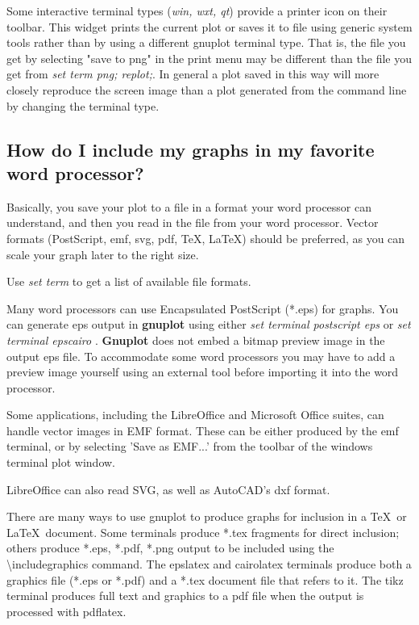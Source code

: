 \documentclass[letter,11pt]{article}
\newcommand{\gnuplot}{\textbf{gnuplot }}
\newcommand{\Gnuplot}{\textbf{Gnuplot }}
\begin{document}
{Some interactive terminal types ({\em win, wxt, qt}) provide a printer icon
on their toolbar. This widget prints the current plot or saves it to file
using generic system tools rather than by using a different gnuplot terminal type.
That is, the file you get by selecting "save to png" in the print menu may be
different than the file you get from {\em set term png; replot;}.
In general a plot saved in this way will more closely reproduce the screen image than
a plot generated from the command line by changing the terminal type.


\subsection{How do I include my graphs in my favorite word processor?}

Basically, you save your plot to a file in a format your word processor
can understand, and then you read in the file from your word processor. Vector
formats (PostScript, emf, svg, pdf, \TeX{}, \LaTeX{}) should be preferred,
as you can scale your graph later to the right size.

Use {\em set term} to get a list of available file formats.

Many word processors can use Encapsulated PostScript (*.eps) for graphs.
You can generate eps output in \gnuplot using either
{\em set terminal postscript eps}
or
{\em set terminal epscairo}
.
\Gnuplot does not embed a bitmap preview image in the output eps file.
To accommodate some word processors you may have to add a preview image yourself
using an external tool before importing it into the word processor.

Some applications, including the LibreOffice and Microsoft Office suites,
can handle vector images in EMF format. These can be either produced by the emf
terminal, or by selecting 'Save as EMF...' from the toolbar of the
windows terminal plot window.

LibreOffice can also read SVG, as well as AutoCAD's dxf format.

There are many ways to use gnuplot to produce graphs for inclusion in a
\TeX\ or \LaTeX\ document.
Some terminals produce *.tex fragments for direct inclusion; others
produce *.eps, *.pdf, *.png output to be included using the
\textbackslash{}includegraphics command.
The epslatex and cairolatex terminals produce both a graphics
file (*.eps or *.pdf) and a *.tex document file that refers to it.
The tikz terminal produces full text and graphics to a pdf file
when the output is processed with pdflatex.

}
\end{document}

